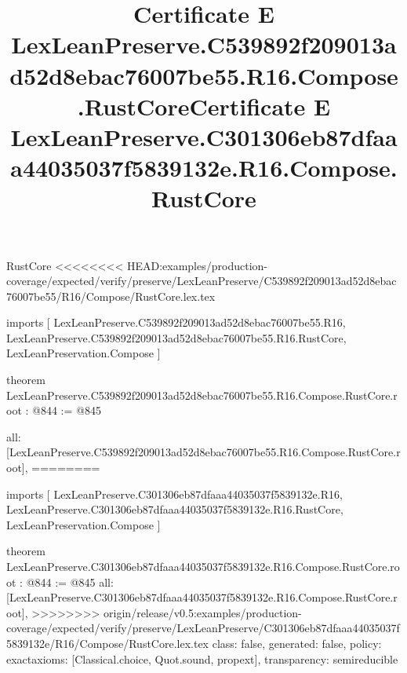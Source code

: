 \begin{lexlean}{RustCore}
<<<<<<<< HEAD:examples/production-coverage/expected/verify/preserve/LexLeanPreserve/C539892f209013ad52d8ebac76007be55/R16/Compose/RustCore.lex.tex
\title{Certificate E LexLeanPreserve.C539892f209013ad52d8ebac76007be55.R16.Compose.RustCore}
\begin{coremodule}
imports [
  LexLeanPreserve.C539892f209013ad52d8ebac76007be55.R16,
  LexLeanPreserve.C539892f209013ad52d8ebac76007be55.R16.RustCore,
  LexLeanPreservation.Compose
]

theorem LexLeanPreserve.C539892f209013ad52d8ebac76007be55.R16.Compose.RustCore.root : @844 := @845 {
  all: [LexLeanPreserve.C539892f209013ad52d8ebac76007be55.R16.Compose.RustCore.root],
========
\title{Certificate E LexLeanPreserve.C301306eb87dfaaa44035037f5839132e.R16.Compose.RustCore}
\begin{coremodule}
imports [
  LexLeanPreserve.C301306eb87dfaaa44035037f5839132e.R16,
  LexLeanPreserve.C301306eb87dfaaa44035037f5839132e.R16.RustCore,
  LexLeanPreservation.Compose
]

theorem LexLeanPreserve.C301306eb87dfaaa44035037f5839132e.R16.Compose.RustCore.root : @844 := @845 {
  all: [LexLeanPreserve.C301306eb87dfaaa44035037f5839132e.R16.Compose.RustCore.root],
>>>>>>>> origin/release/v0.5:examples/production-coverage/expected/verify/preserve/LexLeanPreserve/C301306eb87dfaaa44035037f5839132e/R16/Compose/RustCore.lex.tex
  class: false,
  generated: false,
  policy: exact{axioms: [Classical.choice, Quot.sound, propext]},
  transparency: semireducible
}


\end{coremodule}}
\end{coremodule}
\end{lexlean}

